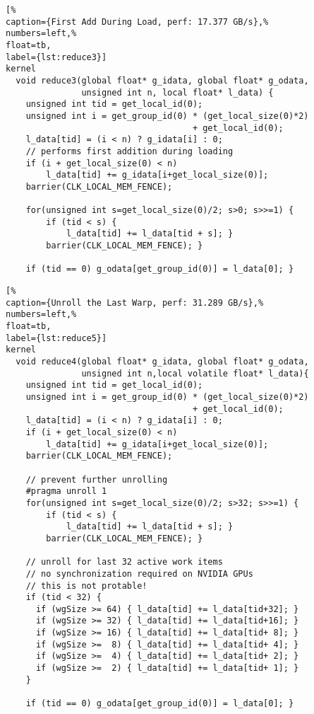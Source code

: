 \begin{lstlisting}[%                                                             
caption={First Add During Load, perf: 17.377 GB/s},%
numbers=left,%
float=tb,
label={lst:reduce3}]
kernel
  void reduce3(global float* g_idata, global float* g_odata,
               unsigned int n, local float* l_data) {
    unsigned int tid = get_local_id(0);
    unsigned int i = get_group_id(0) * (get_local_size(0)*2)
                                     + get_local_id(0);
    l_data[tid] = (i < n) ? g_idata[i] : 0;
    // performs first addition during loading
    if (i + get_local_size(0) < n) 
        l_data[tid] += g_idata[i+get_local_size(0)];  
    barrier(CLK_LOCAL_MEM_FENCE);

    for(unsigned int s=get_local_size(0)/2; s>0; s>>=1) {
        if (tid < s) {
            l_data[tid] += l_data[tid + s]; }
        barrier(CLK_LOCAL_MEM_FENCE); }

    if (tid == 0) g_odata[get_group_id(0)] = l_data[0]; }
\end{lstlisting}

\begin{lstlisting}[%                                                             
caption={Unroll the Last Warp, perf: 31.289 GB/s},%
numbers=left,%
float=tb,
label={lst:reduce5}]
kernel
  void reduce4(global float* g_idata, global float* g_odata,
               unsigned int n,local volatile float* l_data){
    unsigned int tid = get_local_id(0);
    unsigned int i = get_group_id(0) * (get_local_size(0)*2)
                                     + get_local_id(0);
    l_data[tid] = (i < n) ? g_idata[i] : 0;
    if (i + get_local_size(0) < n) 
        l_data[tid] += g_idata[i+get_local_size(0)];  
    barrier(CLK_LOCAL_MEM_FENCE);

    // prevent further unrolling
    #pragma unroll 1
    for(unsigned int s=get_local_size(0)/2; s>32; s>>=1) {
        if (tid < s) {
            l_data[tid] += l_data[tid + s]; }
        barrier(CLK_LOCAL_MEM_FENCE); }

    // unroll for last 32 active work items
    // no synchronization required on NVIDIA GPUs
    // this is not protable!
    if (tid < 32) {
      if (wgSize >= 64) { l_data[tid] += l_data[tid+32]; }
      if (wgSize >= 32) { l_data[tid] += l_data[tid+16]; }
      if (wgSize >= 16) { l_data[tid] += l_data[tid+ 8]; }
      if (wgSize >=  8) { l_data[tid] += l_data[tid+ 4]; }
      if (wgSize >=  4) { l_data[tid] += l_data[tid+ 2]; }
      if (wgSize >=  2) { l_data[tid] += l_data[tid+ 1]; }
    }

    if (tid == 0) g_odata[get_group_id(0)] = l_data[0]; }
\end{lstlisting}

